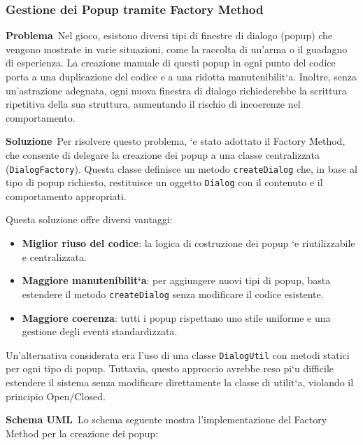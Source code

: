 \documentclass[a4paper,12pt]{report}
\begin{document}
\subsubsection{Gestione dei Popup tramite Factory Method}

\textbf{Problema}\
Nel gioco, esistono diversi tipi di finestre di dialogo (popup) che vengono mostrate in varie situazioni, come la raccolta di un'arma o il guadagno di esperienza. La creazione manuale di questi popup in ogni punto del codice porta a una duplicazione del codice e a una ridotta manutenibilit`a. Inoltre, senza un’astrazione adeguata, ogni nuova finestra di dialogo richiederebbe la scrittura ripetitiva della sua struttura, aumentando il rischio di incoerenze nel comportamento.

\textbf{Soluzione}\
Per risolvere questo problema, `e stato adottato il Factory Method, che consente di delegare la creazione dei popup a una classe centralizzata (\texttt{DialogFactory}). Questa classe definisce un metodo \texttt{createDialog} che, in base al tipo di popup richiesto, restituisce un oggetto \texttt{Dialog} con il contenuto e il comportamento appropriati.

Questa soluzione offre diversi vantaggi:
\begin{itemize}
\item \textbf{Miglior riuso del codice}: la logica di costruzione dei popup `e riutilizzabile e centralizzata.
\item \textbf{Maggiore manutenibilit`a}: per aggiungere nuovi tipi di popup, basta estendere il metodo \texttt{createDialog} senza modificare il codice esistente.
\item \textbf{Maggiore coerenza}: tutti i popup rispettano uno stile uniforme e una gestione degli eventi standardizzata.
\end{itemize}

Un’alternativa considerata era l’uso di una classe \texttt{DialogUtil} con metodi statici per ogni tipo di popup. Tuttavia, questo approccio avrebbe reso pi`u difficile estendere il sistema senza modificare direttamente la classe di utilit`a, violando il principio Open/Closed.

\textbf{Schema UML}\
Lo schema seguente mostra l'implementazione del Factory Method per la creazione dei popup:
\end{document}
